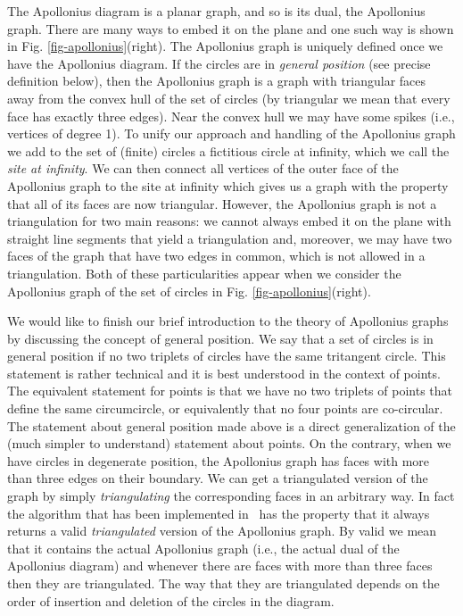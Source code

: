 The Apollonius diagram is a planar graph, and so is its dual, the
Apollonius graph. There are many ways to embed it on the plane and one
such way is shown in Fig. \ref{fig-apollonius}(right).
The Apollonius graph is uniquely defined once we have
the Apollonius diagram. If the circles are in {\em general position}
(see precise definition below), then the Apollonius graph is a graph
with triangular faces away from 
the convex hull of the set of circles (by triangular we mean that
every face has exactly three edges). Near the convex hull we may
have some spikes (i.e., vertices of degree 1). To unify our approach
and handling of the Apollonius graph we add to the set of (finite)
circles a fictitious circle at infinity, which we call the
{\em site at infinity}. We can then connect all vertices of the outer
face of the Apollonius graph to the site at infinity which gives us
a graph with the property that all of its faces are now
triangular. However, the Apollonius graph is not a triangulation for
two main reasons: we cannot always embed it on the plane with straight
line segments that yield a triangulation and, moreover, we may have two
faces of the graph that have two edges in common, which is not allowed
in a triangulation. Both of these particularities appear when we
consider the Apollonius graph of the set of circles in
Fig. \ref{fig-apollonius}(right).


We would like to finish our brief introduction to the theory of
Apollonius graphs by discussing the concept of general position. We say
that a set of circles is in general position if no two triplets of
circles have the same tritangent circle. This statement is rather
technical and it is best understood in the context of points. The
equivalent statement for points is that we have no two triplets of
points that define the same circumcircle, or equivalently that no
four points are co-circular. The statement about general position made
above is a direct generalization of the (much simpler to understand)
statement about points. On the contrary, when we have circles in
degenerate position, the Apollonius graph has faces with more than
three edges on their boundary. We can get a triangulated version of
the graph by simply {\em triangulating} the corresponding faces in an
arbitrary way. In fact the algorithm that has been implemented in
\cgal\ has the property that it always returns a valid
{\em triangulated} version of the Apollonius graph. By valid we mean
that it contains the actual Apollonius graph (i.e., the actual dual of
the Apollonius diagram) and whenever there are faces with more than
three faces then they are triangulated. The way that they are
triangulated depends on the order of insertion and deletion of the
circles in the diagram.




